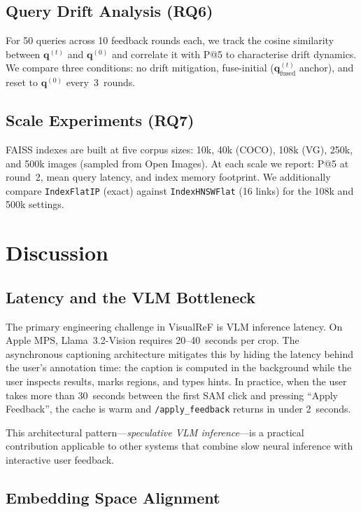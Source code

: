 \documentclass[12pt,a4paper]{article}
\newcommand{\vq}{\bm{q}}
\begin{document}
\subsection{Query Drift Analysis (RQ6)}

For 50 queries across 10 feedback rounds each, we track the cosine similarity
between $\vq^{(t)}$ and $\vq^{(0)}$ and correlate it with P@5 to characterise
drift dynamics. We compare three conditions: no drift mitigation, fuse-initial
($\vq_{\text{fused}}^{(t)}$ anchor), and reset to $\vq^{(0)}$ every~3~rounds.

\subsection{Scale Experiments (RQ7)}

FAISS indexes are built at five corpus sizes: 10k, 40k (COCO), 108k (VG),
250k, and 500k images (sampled from Open Images). At each scale we report:
P@5 at round~2, mean query latency, and index memory footprint. We additionally
compare \texttt{IndexFlatIP} (exact) against \texttt{IndexHNSWFlat} (16 links)
for the 108k and 500k settings.

\section{Discussion}
\label{sec:discussion}

\subsection{Latency and the VLM Bottleneck}

The primary engineering challenge in VisualReF is VLM inference latency. On
Apple MPS, Llama~3.2-Vision requires 20--40~seconds per crop. The asynchronous
captioning architecture mitigates this by hiding the latency behind the user's
annotation time: the caption is computed in the background while the user
inspects results, marks regions, and types hints. In practice, when the user
takes more than 30~seconds between the first SAM click and pressing ``Apply
Feedback'', the cache is warm and \texttt{/apply\_feedback} returns in under
2~seconds.

This architectural pattern—\emph{speculative VLM inference}—is a practical
contribution applicable to other systems that combine slow neural inference
with interactive user feedback.

\subsection{Embedding Space Alignment}
\end{document}
